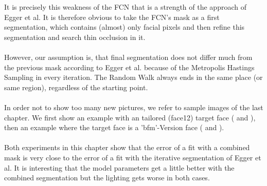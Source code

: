 It is precisely this weakness of the FCN that is a strength of the approach of Egger et al. It is therefore obvious to take the FCN's mask as a first segmentation, which contains (almost) only facial pixels and then refine this segmentation and search thin occlusion in it.\\
\\
However, our assumption is, that final segmentation does not differ much from the previous mask according to Egger et al. because of the Metropolis Hastings Sampling in every iteration. The Random Walk always ends in the same place (or same region), regardless of the starting point.\\
\\
In order not to show too many new pictures, we refer to sample images of the last chapter. We first show an example with an tailored (face12) target face ( and ), then an example where the target face is a 'bfm'-Version face ( and ). \\
\\
Both experiments in this chapter show that the error of a fit with a combined mask is very close to the error of a fit with the iterative segmentation of Egger et al. It is interesting that the model parameters get a little better with the combined segmentation but the lighting gets worse in both cases.\\

